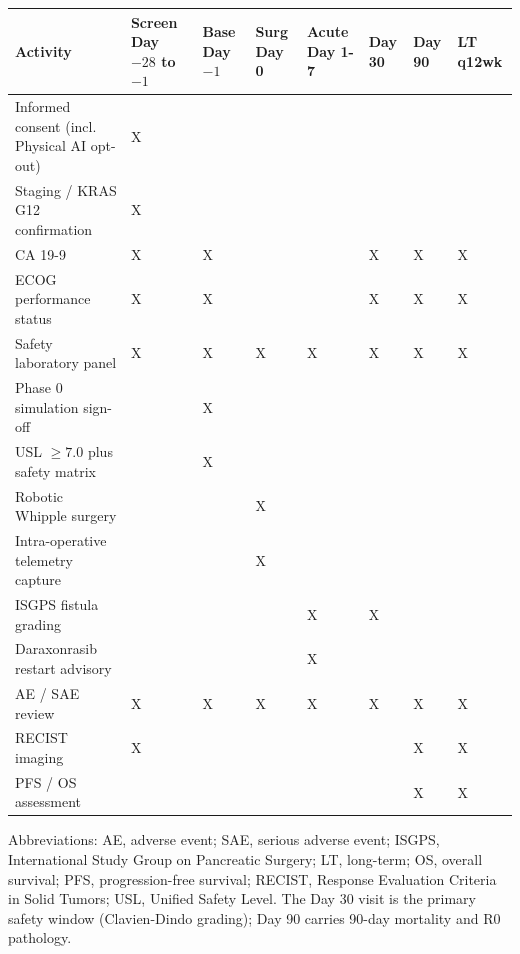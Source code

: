 \vspace{0.3em}

\noindent\begin{tabularx}{\textwidth}{L{4.0cm} C{1.35cm} C{1.25cm} C{1.15cm} C{1.25cm} C{1.0cm} C{1.0cm} C{1.45cm}}
\toprule
\textbf{Activity} & \textbf{Screen Day $-28$ to $-1$} & \textbf{Base Day $-1$} & \textbf{Surg Day 0} & \textbf{Acute Day 1-7} & \textbf{Day 30} & \textbf{Day 90} & \textbf{LT q12wk} \\
\midrule
Informed consent (incl. Physical AI opt-out) & X & & & & & & \\
Staging / KRAS G12 confirmation & X & & & & & & \\
CA 19-9 & X & X & & & X & X & X \\
ECOG performance status & X & X & & & X & X & X \\
Safety laboratory panel & X & X & X & X & X & X & X \\
Phase 0 simulation sign-off & & X & & & & & \\
USL $\geq 7.0$ plus safety matrix & & X & & & & & \\
Robotic Whipple surgery & & & X & & & & \\
Intra-operative telemetry capture & & & X & & & & \\
ISGPS fistula grading & & & & X & X & & \\
Daraxonrasib restart advisory & & & & X & & & \\
AE / SAE review & X & X & X & X & X & X & X \\
RECIST imaging & X & & & & & X & X \\
PFS / OS assessment & & & & & & X & X \\
\bottomrule
\end{tabularx}

\vspace{0.3em}

\noindent Abbreviations: AE, adverse event; SAE, serious adverse event; ISGPS,
International Study Group on Pancreatic Surgery; LT, long-term; OS, overall
survival; PFS, progression-free survival; RECIST, Response Evaluation Criteria in
Solid Tumors; USL, Unified Safety Level. The Day 30 visit is the primary safety
window (Clavien-Dindo grading); Day 90 carries 90-day mortality and R0 pathology.
